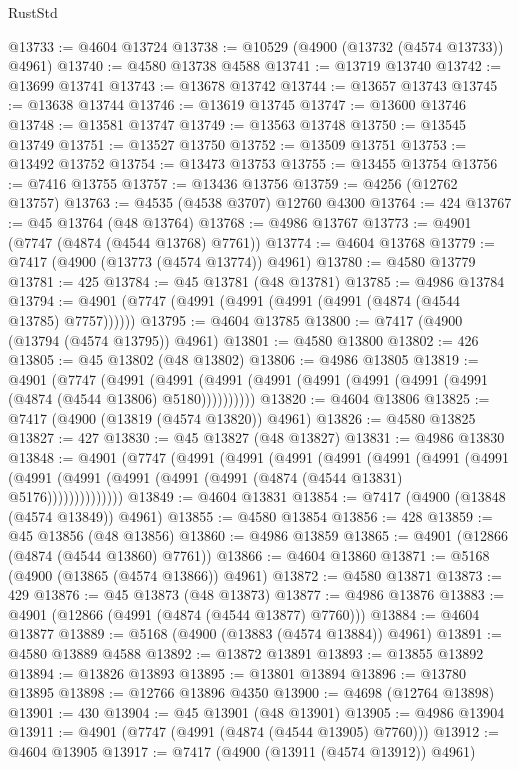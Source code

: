 \begin{lexlean}{RustStd}
\begin{coremodule}
@13733 := @4604 @13724
@13738 := @10529 (@4900 (@13732 (@4574 @13733)) @4961)
@13740 := @4580 @13738 @4588
@13741 := @13719 @13740
@13742 := @13699 @13741
@13743 := @13678 @13742
@13744 := @13657 @13743
@13745 := @13638 @13744
@13746 := @13619 @13745
@13747 := @13600 @13746
@13748 := @13581 @13747
@13749 := @13563 @13748
@13750 := @13545 @13749
@13751 := @13527 @13750
@13752 := @13509 @13751
@13753 := @13492 @13752
@13754 := @13473 @13753
@13755 := @13455 @13754
@13756 := @7416 @13755
@13757 := @13436 @13756
@13759 := @4256 (@12762 @13757)
@13763 := @4535 (@4538 @3707) @12760 @4300
@13764 := 424
@13767 := @45 @13764 (@48 @13764)
@13768 := @4986 @13767
@13773 := @4901 (@7747 (@4874 (@4544 @13768) @7761))
@13774 := @4604 @13768
@13779 := @7417 (@4900 (@13773 (@4574 @13774)) @4961)
@13780 := @4580 @13779
@13781 := 425
@13784 := @45 @13781 (@48 @13781)
@13785 := @4986 @13784
@13794 := @4901 (@7747 (@4991 (@4991 (@4991 (@4991 (@4874 (@4544 @13785) @7757))))))
@13795 := @4604 @13785
@13800 := @7417 (@4900 (@13794 (@4574 @13795)) @4961)
@13801 := @4580 @13800
@13802 := 426
@13805 := @45 @13802 (@48 @13802)
@13806 := @4986 @13805
@13819 := @4901
    (@7747
      (@4991 (@4991 (@4991 (@4991 (@4991 (@4991 (@4991 (@4991 (@4874 (@4544 @13806) @5180))))))))))
@13820 := @4604 @13806
@13825 := @7417 (@4900 (@13819 (@4574 @13820)) @4961)
@13826 := @4580 @13825
@13827 := 427
@13830 := @45 @13827 (@48 @13827)
@13831 := @4986 @13830
@13848 := @4901
    (@7747
      (@4991
        (@4991
          (@4991
            (@4991
              (@4991
                (@4991
                  (@4991
                    (@4991 (@4991 (@4991 (@4991 (@4991 (@4874 (@4544 @13831) @5176))))))))))))))
@13849 := @4604 @13831
@13854 := @7417 (@4900 (@13848 (@4574 @13849)) @4961)
@13855 := @4580 @13854
@13856 := 428
@13859 := @45 @13856 (@48 @13856)
@13860 := @4986 @13859
@13865 := @4901 (@12866 (@4874 (@4544 @13860) @7761))
@13866 := @4604 @13860
@13871 := @5168 (@4900 (@13865 (@4574 @13866)) @4961)
@13872 := @4580 @13871
@13873 := 429
@13876 := @45 @13873 (@48 @13873)
@13877 := @4986 @13876
@13883 := @4901 (@12866 (@4991 (@4874 (@4544 @13877) @7760)))
@13884 := @4604 @13877
@13889 := @5168 (@4900 (@13883 (@4574 @13884)) @4961)
@13891 := @4580 @13889 @4588
@13892 := @13872 @13891
@13893 := @13855 @13892
@13894 := @13826 @13893
@13895 := @13801 @13894
@13896 := @13780 @13895
@13898 := @12766 @13896 @4350
@13900 := @4698 (@12764 @13898)
@13901 := 430
@13904 := @45 @13901 (@48 @13901)
@13905 := @4986 @13904
@13911 := @4901 (@7747 (@4991 (@4874 (@4544 @13905) @7760)))
@13912 := @4604 @13905
@13917 := @7417 (@4900 (@13911 (@4574 @13912)) @4961)

\end{coremodule}
\end{lexlean}
